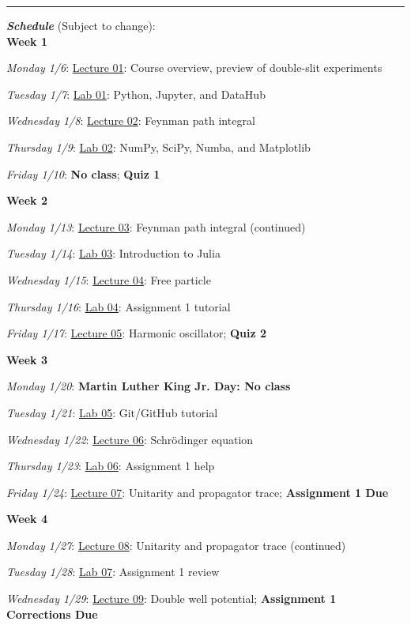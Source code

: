 \documentclass[12pt]{article}
\begin{document}
\begin{center}
  \rule{\textwidth}{0.5pt}
\end{center}

\noindent\textbf{\emph{Schedule}} (Subject to change):\\

\noindent\textbf{Week 1}

\emph{Monday 1/6}: \underline{Lecture 01}: Course overview, preview of double-slit experiments

\emph{Tuesday 1/7}: \underline{Lab 01}: Python, Jupyter, and DataHub

\emph{Wednesday 1/8}: \underline{Lecture 02}: Feynman path integral

\emph{Thursday 1/9}: \underline{Lab 02}: NumPy, SciPy, Numba, and Matplotlib

\emph{Friday 1/10}: \textbf{No class}; \textbf{Quiz 1}

\noindent\textbf{Week 2}

\emph{Monday 1/13}: \underline{Lecture 03}: Feynman path integral (continued)

\emph{Tuesday 1/14}: \underline{Lab 03}: Introduction to Julia

\emph{Wednesday 1/15}: \underline{Lecture 04}: Free particle

\emph{Thursday 1/16}: \underline{Lab 04}: Assignment 1 tutorial

\emph{Friday 1/17}: \underline{Lecture 05}: Harmonic oscillator; \textbf{Quiz 2}

\noindent\textbf{Week 3}

\emph{Monday 1/20}: \textbf{Martin Luther King Jr. Day: No class}

\emph{Tuesday 1/21}: \underline{Lab 05}: Git/GitHub tutorial

\emph{Wednesday 1/22}: \underline{Lecture 06}: Schr\"{o}dinger equation

\emph{Thursday 1/23}: \underline{Lab 06}: Assignment 1 help

\emph{Friday 1/24}: \underline{Lecture 07}: Unitarity and propagator trace; \textbf{Assignment 1 Due}

\noindent\textbf{Week 4}

\emph{Monday 1/27}: \underline{Lecture 08}: Unitarity and propagator trace (continued)

\emph{Tuesday 1/28}: \underline{Lab 07}: Assignment 1 review

\emph{Wednesday 1/29}: \underline{Lecture 09}: Double well potential; \textbf{Assignment 1 Corrections Due}
\end{document}
